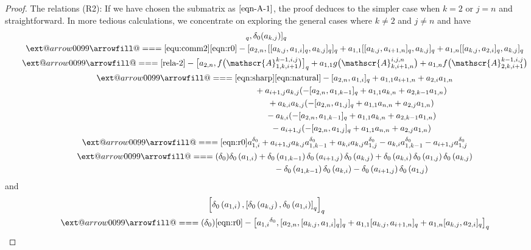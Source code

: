 \documentclass[10pt,a4paper]{amsart}
\makeatletter
\def\x@arrow{\DOTSB\Relbar}
\def\xlongequalsignfill@{\arrowfill@\x@arrow\Relbar\x@arrow}
\providecommand{\xlongequal}[2][]{%
	\ext@arrow 0099\xlongequalsignfill@{#1}{#2}}
\numberwithin{equation}{section}
\def\lr#1{\left[#1\right]}
\def\lrb#1{\left(#1\right)}
\def\d{\delta}
\def\A{\mathscr{A}}
\makeatother
\begin{document}
\begin{proof}
The relations (R2): If we have chosen the submatrix \smash{$\A_{1,k,i+1}^{k-1,i,j}$} as $\eqref{eqn-A-1}$, the proof deduces to the simpler case when $k=2$ or $j=n$ and straightforward.
In more tedious calculations, we concentrate on exploring the general cases where $k\neq 2$ and $j \neq n$ and have
\begin{gather*}
 [ [\d_0 (a_{k,j} ),\d_0 (a_{1,i} ) ]_q, \d_0 (a_{k,j} ) ]_q\\
\qquad \xlongequal[\eqref{equ:comm2}]{\eqref{eqn:r0}} - [a_{2,n}, [ [a_{k,j}, a_{1,i} ]_q, a_{k,j} ]_q ]_q +a_{1,1} [ [a_{k,j}, a_{i+1,n} ]_q, a_{k,j} ]_q +a_{1,n} [ [a_{k,j}, a_{2,i} ]_q, a_{k,j} ]_q\\
\qquad \xlongequal{\eqref{rela-2}} - \bigl[a_{2,n},f\bigl(\A_{1,k,i+1}^{k-1,i,j}\bigr) \bigr]_q
+a_{1,1}g\bigl(\A_{k,i+1,n}^{i,j,n}\bigr) +a_{1,n}f\bigl(\A_{2,k,i+1}^{k-1,i,j}\bigr)\\
 \qquad\xlongequal[\eqref{eqn:sharp}]{\eqref{eqn:natural}} - [a_{2,n}, a_{1,i} ]_q+a_{1,1}a_{i+1,n}+a_{2,i}a_{1,n} \\
\phantom{\qquad \xlongequal{\qquad}\!\! }{} +a_{i+1,j}a_{k,j} (- [a_{2,n}, a_{1,k-1} ]_q+a_{1,1}a_{k,n} +a_{2,k-1}a_{1,n} ) \\
\phantom{\qquad \xlongequal{\qquad}\!\! }{} +a_{k,i}a_{k,j} (- [a_{2,n}, a_{1,j} ]_q+a_{1,1}a_{n,n}+a_{2,j}a_{1,n} ) \\
\phantom{\qquad \xlongequal{\qquad}\!\! }{} -a_{k,i} (- [a_{2,n},a_{1,k-1} ]_q+a_{1,1}a_{k,n}+a_{2,k-1}a_{1,n} ) \\
\phantom{\qquad \xlongequal{\qquad}\!\! }{} -a_{i+1,j} (- [a_{2,n}, a_{1,j} ]_q+a_{1,1}a_{n,n}+a_{2,j}a_{1,n} ) \\
 \qquad\xlongequal{\eqref{eqn:r0}} a_{1,i}^{\d_0}+ a_{i+1,j}a_{k,j} a_{1,k-1}^{\d_0} +a_{k,i}a_{k,j}a_{1,j}^{\d_0}-a_{k,i}a_{1,k-1}^{\d_0}-a_{i+1,j}a_{1,j}^{\d_0}\\
 \qquad\xlongequal{(\d_0)} \d_0\lrb{a_{1,i}}+\d_0\lrb{a_{1,k-1}}\d_0\lrb{a_{i+1,j}}\d_0\lrb{a_{k,j}} +\d_0\lrb{a_{k,i}}\d_0\lrb{a_{1,j}}\d_0\lrb{a_{k,j}}\\
 \phantom{ \qquad\xlongequal{\qquad}\!\! }{} -\d_0\lrb{a_{1,k-1}}\d_0\lrb{a_{k,i}} -\d_0\lrb{a_{i+1,j}}\d_0\lrb{a_{1,j}}
\end{gather*}
and
\begin{gather*}
 \lr{\d_0\lrb{a_{1,i}},\lr{\d_0\lrb{a_{k,j}},\d_0\lrb{a_{1,i}}}_q}_q \\
\qquad \xlongequal[(\d_0)]{\eqref{eqn:r0}} - \bigl[{a_{1,i}}^{\d_0}, [a_{2,n}, [a_{k,j},a_{1,i} ]_q ]_q +a_{1,1} [a_{k,j},a_{i+1,n} ]_q +a_{1,n} [a_{k,j},a_{2,i} ]_q \bigr]_q\\

\end{gather*}
\end{proof}
\end{document}
